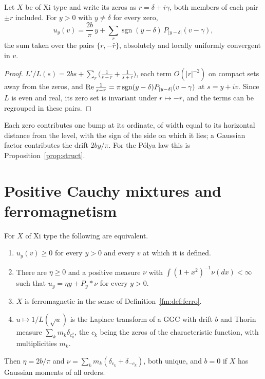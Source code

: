 \begin{theorem}\label{cm:thm:signed}
Let $X$ be of Xi type and write its zeros as $r=\delta+i\gamma$, both members of each pair $\pm r$ included. For $y>0$ with $y\ne\delta$ for every zero,
\[
u_y(v)=\frac{2b}\pi\,y+\sum_r\operatorname{sgn}(y-\delta)\,P_{|y-\delta|}(v-\gamma),
\]
the sum taken over the pairs $\{r,-\bar r\}$, absolutely and locally uniformly convergent in $v$.
\end{theorem}

\begin{proof}
$L'/L(s)=2bs+\sum_r\big(\frac1{s-r}+\frac1{s+r}\big)$, each term $O(|r|^{-2})$ on compact sets away from the zeros, and $\operatorname{Re}\frac1{s-r}=\pi\operatorname{sgn}(y-\delta)P_{|y-\delta|}(v-\gamma)$ at $s=y+iv$. Since $L$ is even and real, its zero set is invariant under $r\mapsto-\bar r$, and the terms can be regrouped in these pairs.
\end{proof}

Each zero contributes one bump at its ordinate, of width equal to its horizontal distance from the level, with the sign of the side on which it lies; a Gaussian factor contributes the drift $2by/\pi$. For the P\'olya law this is Proposition~\ref{prop:struct}.

\section{Positive Cauchy mixtures and ferromagnetism}\label{cm:sec:ferro}

\begin{theorem}\label{cm:thm:ferro}
For $X$ of Xi type the following are equivalent.
\begin{enumerate}
\item[(i)] $u_y(v)\ge0$ for every $y>0$ and every $v$ at which it is defined.
\item[(ii)] There are $\eta\ge0$ and a positive measure $\nu$ with $\int(1+x^2)^{-1}\nu(dx)<\infty$ such that $u_y=\eta y+P_y*\nu$ for every $y>0$.
\item[(iii)] $X$ is ferromagnetic in the sense of Definition~\ref{fm:def:ferro}.
\item[(iv)] $u\mapsto1/L(\sqrt u)$ is the Laplace transform of a GGC with drift $b$ and Thorin measure $\sum_km_k\delta_{c_k^2}$, the $c_k$ being the zeros of the characteristic function, with multiplicities $m_k$.
\end{enumerate}
Then $\eta=2b/\pi$ and $\nu=\sum_km_k(\delta_{c_k}+\delta_{-c_k})$, both unique, and $b=0$ if $X$ has Gaussian moments of all orders.
\end{theorem}

